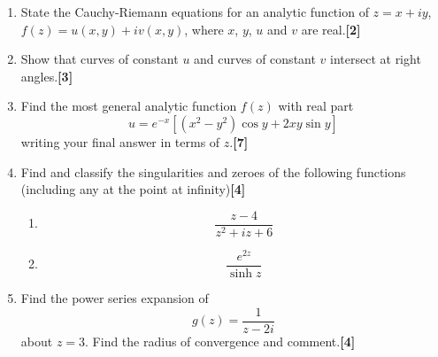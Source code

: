 \documentclass[a4paper]{article}
\begin{document}
\newpage
\begin{qns}\leavevmode
\begin{enumerate}[label=(\alph*)]
\item State the Cauchy-Riemann equations for an analytic function of $z = x + iy$, $f(z) = u(x, y) + iv(x, y)$, where $x$, $y$, $u$ and $v$ are real.\hfill\textbf{[2]}
\item Show that curves of constant $u$ and curves of constant $v$ intersect at right angles.\hfill\textbf{[3]}
\item Find the most general analytic function $f(z)$ with real part 
$$u=e^{-x}[(x^2-y^2)\cos y+2xy\sin y]$$
writing your final answer in terms of $z$.\hfill\textbf{[7]}
\item Find and classify the singularities and zeroes of the following functions (including any at the point at infinity)\hfill\textbf{[4]}
\begin{enumerate}[label=(\roman*)]
    \item $$\frac{z-4}{z^2+iz+6}$$
    \item $$\frac{e^{2z}}{\sinh z}$$
\end{enumerate}
\item Find the power series expansion of
$$g(z)=\frac{1}{z-2i}$$
about $z = 3$. Find the radius of convergence and comment.\hfill\textbf{[4]}
\end{enumerate}
\end{qns}
\end{document}
